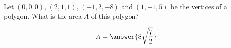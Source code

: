 \documentclass{ximera}
\author{Gregory Hartman \and Matthew Carr}
\begin{document}
\begin{exercise}



Let $(0,0,0)$, $(2,1,1)$, $(-1,2,-8)$  and $(1,-1,5)$ be the vertices of a polygon. What is the area $A$ of this polygon?
\begin{prompt}
\[
A=\answer{8\sqrt{\frac{7}{2}}}
\]
\end{prompt}


\end{exercise}
\end{document}
